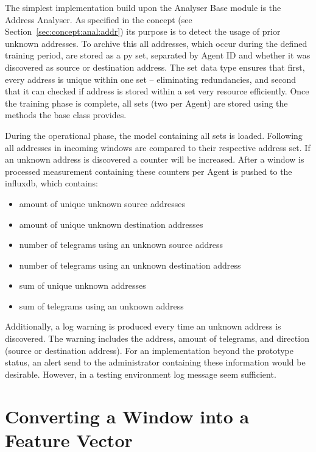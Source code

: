 The simplest implementation build upon the Analyser Base module is the Address Analyser.
As specified in the concept (see Section~\ref{sec:concept:anal:addr}) its purpose is to detect the usage of prior unknown addresses.
To archive this all addresses, which occur during the defined training period, are stored as a \gls{py} set, separated by Agent ID and whether it was discovered as source or destination address. 
The set data type ensures that first, every address is unique within one set -- eliminating redundancies, and second that it can checked if address is stored within a set very resource efficiently.
Once the training phase is complete, all sets (two per Agent) are stored using the methods the base class provides.

During the operational phase, the model containing all sets is loaded. Following all addresses in incoming windows are compared to their respective address set.
If an unknown address is discovered a counter will be increased. After a window is processed measurement containing these counters per Agent is pushed to the \gls{influxdb}, which contains:

\begin{itemize}
	\item amount of unique unknown source addresses
	\item amount of unique unknown destination addresses
	\item number of telegrams using an unknown source address
	\item number of telegrams using an unknown destination address
	\item sum of unique unknown addresses
	\item sum of telegrams using an unknown address
\end{itemize}

Additionally, a log warning is produced every time an unknown address is discovered. The warning includes the address, amount of telegrams, and direction (source or destination address).
For an implementation beyond the prototype status, an alert send to the administrator containing these information would be desirable.
However, in a testing environment log message seem sufficient.

\section{Converting a Window into a Feature Vector}
\label{sec:impl:vectoriser}

